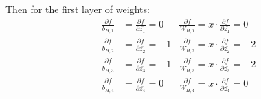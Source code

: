 \documentclass[10pt]{article}
\begin{document}
\begin{enumerate}[(a)]
	Then for the first layer of weights:
	\begin{align*}
	\frac{\partial f}{b_{H,1}} &= \frac{\partial f}{\partial \bar{z_1}} = 0  &  \frac{\partial f}{W_{H,1}} = x\cdot \frac{\partial f}{\partial \bar{z_1}} = 0 \\ 
	\frac{\partial f}{b_{H,2}} &= \frac{\partial f}{\partial \bar{z_2}} = -1  &  \frac{\partial f}{W_{H,2}} = x\cdot \frac{\partial f}{\partial \bar{z_2}} = -2 \\ 
	\frac{\partial f}{b_{H,3}} &= \frac{\partial f}{\partial \bar{z_3}} = -1  &  \frac{\partial f}{W_{H,3}} = x\cdot \frac{\partial f}{\partial \bar{z_3}} = -2 \\ 
	\frac{\partial f}{b_{H,4}} &= \frac{\partial f}{\partial \bar{z_4}} = 0  &  \frac{\partial f}{W_{H,4}} = x\cdot \frac{\partial f}{\partial \bar{z_4}} = 0 
	\end{align*}
	\color{black}
\end{enumerate}
\end{document}
